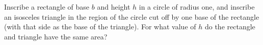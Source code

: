 Inscribe a rectangle of base $b$ and height $h$ in a circle of radius
one, and inscribe an isosceles triangle in the region of the circle
cut off by one base of the rectangle (with that side as the base of
the triangle).
For what
value of $h$ do the rectangle and triangle have the same area?
